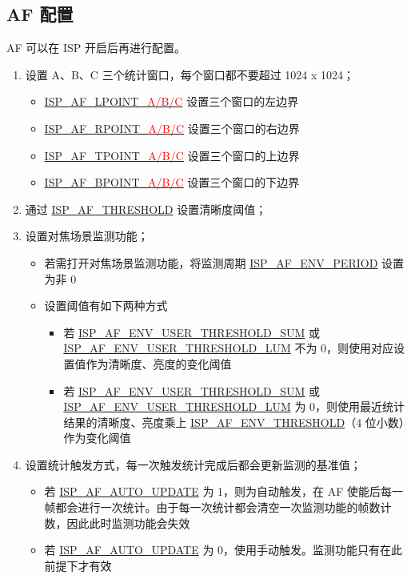 \documentclass[main\_\_CN.tex]{subfiles}
\begin{document}
\subsection{AF 配置}
AF 可以在 ISP 开启后再进行配置。
\begin{enumerate}
    \item 设置 A、B、C 三个统计窗口，每个窗口都不要超过 1024 x 1024；
    \begin{itemize}
        \item \hyperref[fielddesc:ISPAFLPOINTA]{ISP\_AF\_LPOINT\_\textcolor{red}{A/B/C}} 设置三个窗口的左边界
        \item \hyperref[fielddesc:ISPAFRPOINTA]{ISP\_AF\_RPOINT\_\textcolor{red}{A/B/C}} 设置三个窗口的右边界
        \item \hyperref[fielddesc:ISPAFTPOINTA]{ISP\_AF\_TPOINT\_\textcolor{red}{A/B/C}} 设置三个窗口的上边界
        \item \hyperref[fielddesc:ISPAFBPOINTA]{ISP\_AF\_BPOINT\_\textcolor{red}{A/B/C}} 设置三个窗口的下边界
    \end{itemize}

    \item 通过 \hyperref[fielddesc:ISPAFTHRESHOLD]{ISP\_AF\_THRESHOLD} 设置清晰度阈值；

    \item 设置对焦场景监测功能；
    \begin{itemize}
        \item 若需打开对焦场景监测功能，将监测周期 \hyperref[fielddesc:ISPAFENVPERIOD]{ISP\_AF\_ENV\_PERIOD} 设置为非 0
        \item 设置阈值有如下两种方式
        \begin{itemize}
            \item 若 \hyperref[fielddesc:ISPAFENVUSERTHRESHOLDSUM]{ISP\_AF\_ENV\_USER\_THRESHOLD\_SUM} 或 \hyperref[fielddesc:ISPAFENVUSERTHRESHOLDLUM]{ISP\_AF\_ENV\_USER\_THRESHOLD\_LUM} 不为 0，则使用对应设置值作为清晰度、亮度的变化阈值
            \item 若 \hyperref[fielddesc:ISPAFENVUSERTHRESHOLDSUM]{ISP\_AF\_ENV\_USER\_THRESHOLD\_SUM} 或 \hyperref[fielddesc:ISPAFENVUSERTHRESHOLDLUM]{ISP\_AF\_ENV\_USER\_THRESHOLD\_LUM} 为 0，则使用最近统计结果的清晰度、亮度乘上 \hyperref[fielddesc:ISPAFENVTHRESHOLD]{ISP\_AF\_ENV\_THRESHOLD}（4 位小数）作为变化阈值
        \end{itemize}
    \end{itemize}

    \item 设置统计触发方式，每一次触发统计完成后都会更新监测的基准值；
    \begin{itemize}
        \item 若 \hyperref[fielddesc:ISPAFAUTOUPDATE]{ISP\_AF\_AUTO\_UPDATE} 为 1，则为自动触发，在 AF 使能后每一帧都会进行一次统计。由于每一次统计都会清空一次监测功能的帧数计数，因此此时监测功能会失效
        \item 若 \hyperref[fielddesc:ISPAFAUTOUPDATE]{ISP\_AF\_AUTO\_UPDATE} 为 0，使用手动触发。监测功能只有在此前提下才有效
    \end{itemize}


\end{enumerate}
\end{document}
